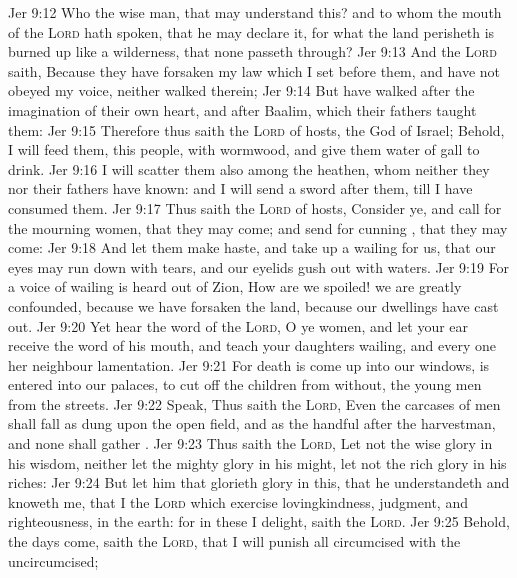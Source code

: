 \vs Jer 9:12 Who  the wise man, that may understand this? and  to whom the mouth of the \textsc{Lord} hath spoken, that he may declare it, for what the land perisheth  is burned up like a wilderness, that none passeth through?
\vs Jer 9:13 And the \textsc{Lord} saith, Because they have forsaken my law which I set before them, and have not obeyed my voice, neither walked therein;
\vs Jer 9:14 But have walked after the imagination of their own heart, and after Baalim, which their fathers taught them:
\vs Jer 9:15 Therefore thus saith the \textsc{Lord} of hosts, the God of Israel; Behold, I will feed them,  this people, with wormwood, and give them water of gall to drink.
\vs Jer 9:16 I will scatter them also among the heathen, whom neither they nor their fathers have known: and I will send a sword after them, till I have consumed them.
\vs Jer 9:17 Thus saith the \textsc{Lord} of hosts, Consider ye, and call for the mourning women, that they may come; and send for cunning , that they may come:
\vs Jer 9:18 And let them make haste, and take up a wailing for us, that our eyes may run down with tears, and our eyelids gush out with waters.
\vs Jer 9:19 For a voice of wailing is heard out of Zion, How are we spoiled! we are greatly confounded, because we have forsaken the land, because our dwellings have cast  out.
\vs Jer 9:20 Yet hear the word of the \textsc{Lord}, O ye women, and let your ear receive the word of his mouth, and teach your daughters wailing, and every one her neighbour lamentation.
\vs Jer 9:21 For death is come up into our windows,  is entered into our palaces, to cut off the children from without,  the young men from the streets.
\vs Jer 9:22 Speak, Thus saith the \textsc{Lord}, Even the carcases of men shall fall as dung upon the open field, and as the handful after the harvestman, and none shall gather .
\vs Jer 9:23 Thus saith the \textsc{Lord}, Let not the wise  glory in his wisdom, neither let the mighty  glory in his might, let not the rich  glory in his riches:
\vs Jer 9:24 But let him that glorieth glory in this, that he understandeth and knoweth me, that I  the \textsc{Lord} which exercise lovingkindness, judgment, and righteousness, in the earth: for in these  I delight, saith the \textsc{Lord}.
\vs Jer 9:25 Behold, the days come, saith the \textsc{Lord}, that I will punish all  circumcised with the uncircumcised;
